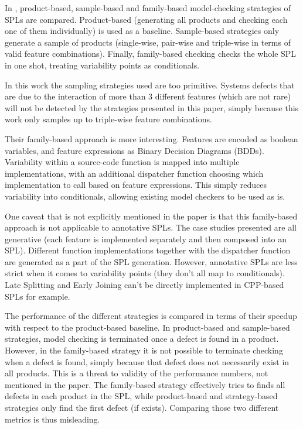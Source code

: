 \documentclass[11pt]{article}
\begin{document}
In \cite{Apel:2013}, product-based, sample-based and family-based model-checking strategies of SPLs are compared. Product-based (generating all products and checking each one of them individually) is used as a baseline. Sample-based strategies only generate a sample of products (single-wise, pair-wise and triple-wise in terms of valid feature combinations). Finally, family-based checking checks the whole SPL in one shot, treating variability points as conditionals.

In this work the sampling strategies used are too primitive. Systems defects that are due to the interaction of more than 3 different features (which are not rare) will not be detected by the strategies presented in this paper, simply because this work only samples up to triple-wise feature combinations.

Their family-based approach is more interesting. Features are encoded as boolean variables, and feature expressions as Binary Decision Diagrams (BDDs). Variability within a source-code function is mapped into multiple implementations, with an additional dispatcher function choosing which implementation to call based on feature expressions. This simply reduces variability into conditionals, allowing existing model checkers to be used as is.

One caveat that is not explicitly mentioned in the paper is that this family-based approach is not applicable to annotative SPLs. The case studies presented are all generative (each feature is implemented separately and then composed into an SPL). Different function implementations together with the dispatcher function are generated as a part of the SPL generation. However, annotative SPLs are less strict when it comes to variability points (they don't all map to conditionals). Late Splitting and Early Joining can't be directly implemented in CPP-based SPLs for example.

The performance of the different strategies is compared in terms of their speedup with respect to the product-based baseline. In product-based and sample-based strategies, model checking is terminated once a defect is found in a product. However, in the family-based strategy it is not possible to terminate checking when a defect is found, simply because that defect does not necessarily exist in all products. This is a threat to validity of the performance numbers, not mentioned in the paper. The family-based strategy effectively tries to finds all defects in each product in the SPL, while product-based and strategy-based strategies only find the first defect (if exists). Comparing those two different metrics is thus misleading.
\end{document}
